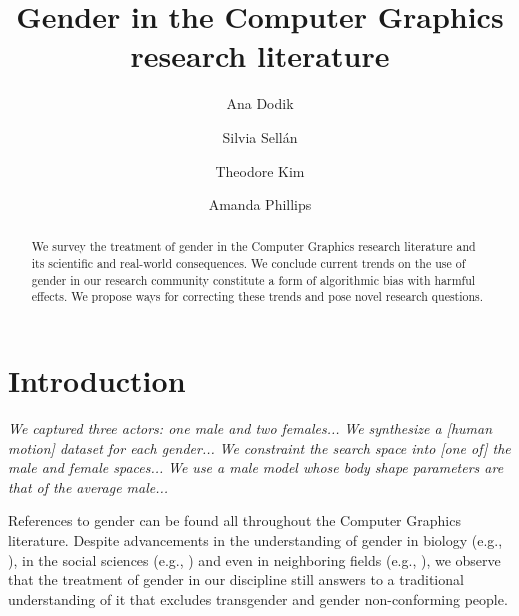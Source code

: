 \documentclass[sigconf,review,balance=false]{acmart}
\begin{document}
\title{Gender in the Computer Graphics research literature}

\author{Ana Dodik}

\author{Silvia Sellán}\authornotemark[1]


\author{Theodore Kim}

\author{Amanda Phillips}


\begin{abstract}
    We survey the treatment of gender in the Computer Graphics research
    literature and its scientific and real-world consequences. We conclude
    current trends on the use of gender in our research community constitute a
    form of algorithmic bias with harmful effects. We propose ways for
    correcting these trends and pose novel research questions.
\end{abstract}


\maketitle


\section{Introduction}

\textit{We captured three actors: one male and two females...} \textit{We
synthesize a [human motion] dataset for each gender...} \textit{We constraint
the search space into [one of] the male and female spaces...} \textit{We use a
male model whose body shape parameters are that of the average male...}

References to gender can be found all throughout the Computer Graphics
literature. Despite advancements in the understanding of gender  in biology (e.g., \cite{fausto2012sex}), in the social sciences (e.g., \cite{butler2003gender}) and even in neighboring
fields (e.g., \cite{keyes2021you}), we observe that the treatment of gender in our discipline
still answers to a traditional understanding of it that excludes transgender and
gender non-conforming people.
\end{document}
